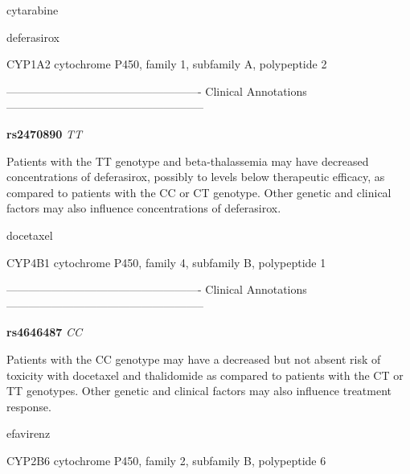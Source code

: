 \documentclass{resume} %
\begin{document}
\begin{rSection}{ cytarabine }
\end{rSection}\begin{rSection}{ deferasirox }
\item[]

\begin{rSubsection}{ CYP1A2 }{ cytochrome P450, family 1, subfamily A, polypeptide 2 }{}{}
\item[]

\item[] ---------------------------------------------------- Clinical Annotations -----------------------------------------------------\newline
\item \textbf{ rs2470890 } \textit{ TT }
\item[] Patients with the TT genotype and beta-thalassemia may have decreased concentrations of deferasirox, possibly to levels below therapeutic efficacy, as compared to patients with the CC or CT genotype. Other genetic and clinical factors may also influence concentrations of deferasirox.
\end{rSubsection}

\end{rSection}\begin{rSection}{ docetaxel }
\item[]

\begin{rSubsection}{ CYP4B1 }{ cytochrome P450, family 4, subfamily B, polypeptide 1 }{}{}
\item[]

\item[] ---------------------------------------------------- Clinical Annotations -----------------------------------------------------\newline
\item \textbf{ rs4646487 } \textit{ CC }
\item[] Patients with the CC genotype may have a decreased but not absent risk of toxicity with docetaxel and thalidomide as compared to patients with the CT or TT genotypes. Other genetic and clinical factors may also influence treatment response.
\end{rSubsection}

\end{rSection}\begin{rSection}{ efavirenz }
\item[]

\begin{rSubsection}{ CYP2B6 }{ cytochrome P450, family 2, subfamily B, polypeptide 6 }{}{}
\item[]


\end{rSubsection}
\end{rSection}
\end{document}
